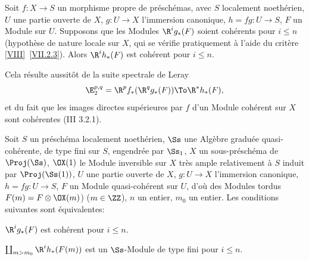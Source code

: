 \begin{proposition} \label{XII.5.1}
Soit $f:X\to S$ un morphisme propre de pr\'esch\'emas, avec $S$ localement noeth\'erien, $U$ une partie ouverte de $X$, $g:U\to X$ l'immersion canonique, $h=fg:U\to S$, $F$ un Module sur $U$. Supposons que les Modules $\R^ig_\ast(F)$ soient coh\'erents pour $i\leq n$ (hypoth\`ese de nature locale sur $X$, qui se v\'erifie pratiquement \`a l'aide du crit\`ere \ref{VIII}~\ref{VII.2.3}). Alors $\R^ih_\ast(F)$ est coh\'erent pour $i\leq n$.
\end{proposition}

Cela r\'esulte aussit\^{o}t de la suite spectrale de Leray
\steco
\begin{equation} \label{eq:XII.26} {} \E_2^{p, q}=\R^pf_\ast(\R^qg_\ast(F)) \To \R^\ast h_\ast(F),
\end{equation}
et du fait que les images directes sup\'erieures par $f$ d'un Module coh\'erent sur $X$ sont coh\'erentes (\EGA III 3.2.1).

\begin{proposition} \label{XII.5.2}
Soit $S$ un pr\'esch\'ema localement noeth\'erien, $\Ss$ une Alg\`ebre gradu\'ee quasi-coh\'erente, de type fini sur $S$, engendr\'ee par $\Ss_1$, $X$ un sous-pr\'esch\'ema de $\Proj(\Ss)$, $\OX(1)$ le Module inversible sur $X$ tr\`es ample relativement \`a $S$ induit par $\Proj(\Ss(1))$, $U$ une partie ouverte de $X$, $g:U\to X$ l'immersion canonique, $h=fg:U\to S$, $F$ un Module quasi-coh\'erent sur $U$, d'o\`u des Modules tordus $F(m)=F\otimes \OX(m)$) ($m\in\ZZ$), $n$ un entier, $m_0$ un entier. Les conditions suivantes sont \'equivalentes:
\begin{enumeratei}
\item
$\R^ig_\ast(F)$ est coh\'erent pour $i\leq n$.
\item
$\coprod_{m>m_0}\R^ih_\ast(F(m))$ est un $\Ss$-Module de type fini pour $i\leq n$.
\end{enumeratei}
\end{proposition}


